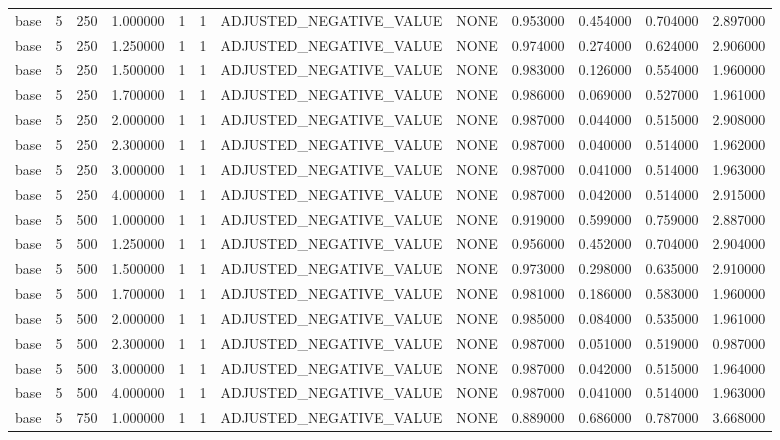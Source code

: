 \begin{tabular}{lrrrllllrrrr}
base & 5 & 250 & 1.000000 & 1 & 1 & ADJUSTED_NEGATIVE_VALUE & NONE & 0.953000 & 0.454000 & 0.704000 & 2.897000 \\
base & 5 & 250 & 1.250000 & 1 & 1 & ADJUSTED_NEGATIVE_VALUE & NONE & 0.974000 & 0.274000 & 0.624000 & 2.906000 \\
base & 5 & 250 & 1.500000 & 1 & 1 & ADJUSTED_NEGATIVE_VALUE & NONE & 0.983000 & 0.126000 & 0.554000 & 1.960000 \\
base & 5 & 250 & 1.700000 & 1 & 1 & ADJUSTED_NEGATIVE_VALUE & NONE & 0.986000 & 0.069000 & 0.527000 & 1.961000 \\
base & 5 & 250 & 2.000000 & 1 & 1 & ADJUSTED_NEGATIVE_VALUE & NONE & 0.987000 & 0.044000 & 0.515000 & 2.908000 \\
base & 5 & 250 & 2.300000 & 1 & 1 & ADJUSTED_NEGATIVE_VALUE & NONE & 0.987000 & 0.040000 & 0.514000 & 1.962000 \\
base & 5 & 250 & 3.000000 & 1 & 1 & ADJUSTED_NEGATIVE_VALUE & NONE & 0.987000 & 0.041000 & 0.514000 & 1.963000 \\
base & 5 & 250 & 4.000000 & 1 & 1 & ADJUSTED_NEGATIVE_VALUE & NONE & 0.987000 & 0.042000 & 0.514000 & 2.915000 \\
base & 5 & 500 & 1.000000 & 1 & 1 & ADJUSTED_NEGATIVE_VALUE & NONE & 0.919000 & 0.599000 & 0.759000 & 2.887000 \\
base & 5 & 500 & 1.250000 & 1 & 1 & ADJUSTED_NEGATIVE_VALUE & NONE & 0.956000 & 0.452000 & 0.704000 & 2.904000 \\
base & 5 & 500 & 1.500000 & 1 & 1 & ADJUSTED_NEGATIVE_VALUE & NONE & 0.973000 & 0.298000 & 0.635000 & 2.910000 \\
base & 5 & 500 & 1.700000 & 1 & 1 & ADJUSTED_NEGATIVE_VALUE & NONE & 0.981000 & 0.186000 & 0.583000 & 1.960000 \\
base & 5 & 500 & 2.000000 & 1 & 1 & ADJUSTED_NEGATIVE_VALUE & NONE & 0.985000 & 0.084000 & 0.535000 & 1.961000 \\
base & 5 & 500 & 2.300000 & 1 & 1 & ADJUSTED_NEGATIVE_VALUE & NONE & 0.987000 & 0.051000 & 0.519000 & 0.987000 \\
base & 5 & 500 & 3.000000 & 1 & 1 & ADJUSTED_NEGATIVE_VALUE & NONE & 0.987000 & 0.042000 & 0.515000 & 1.964000 \\
base & 5 & 500 & 4.000000 & 1 & 1 & ADJUSTED_NEGATIVE_VALUE & NONE & 0.987000 & 0.041000 & 0.514000 & 1.963000 \\
base & 5 & 750 & 1.000000 & 1 & 1 & ADJUSTED_NEGATIVE_VALUE & NONE & 0.889000 & 0.686000 & 0.787000 & 3.668000 \\

\end{tabular}
